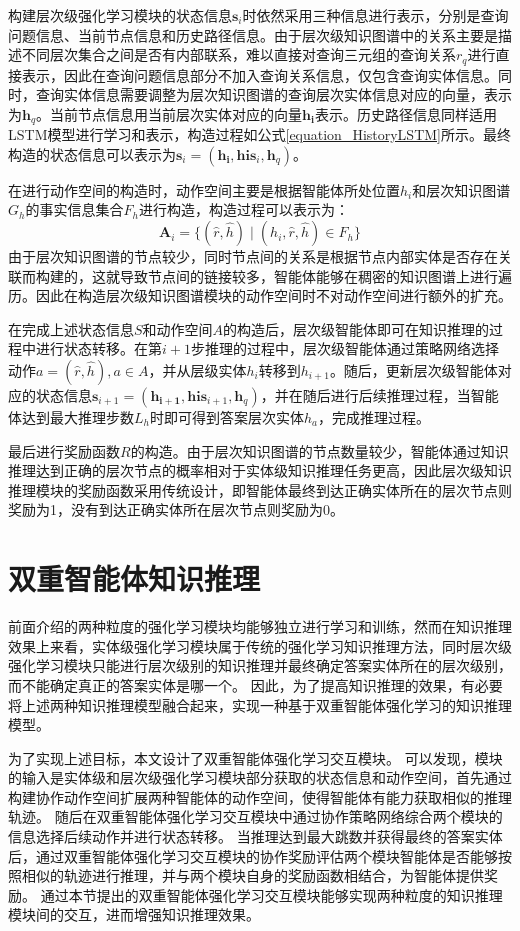\documentclass[algorithmlist, AutoFakeBold, AutoFakeSlant, figurelist, tablelist, nomlist, engineering]{seuthesix}
\begin{document}
构建层次级强化学习模块的状态信息$\bm{s}_i$时依然采用三种信息进行表示，分别是查询问题信息、当前节点信息和历史路径信息。由于层次级知识图谱中的关系主要是描述不同层次集合之间是否有内部联系，难以直接对查询三元组的查询关系$r_q$进行直接表示，因此在查询问题信息部分不加入查询关系信息，仅包含查询实体信息。同时，查询实体信息需要调整为层次知识图谱的查询层次实体信息对应的向量，表示为$\bm{h}_q$。当前节点信息用当前层次实体对应的向量$\bm{h_i}$表示。历史路径信息同样适用LSTM模型进行学习和表示，构造过程如公式\ref{equation_HistoryLSTM}所示。最终构造的状态信息可以表示为$\bm{s}_i = (\bm{h_i}, \bm{his}_i, \bm{h}_q)$。

在进行动作空间的构造时，动作空间主要是根据智能体所处位置$h_i$和层次知识图谱$G_h$的事实信息集合$F_h$进行构造，构造过程可以表示为：
\begin{equation}
  \bm{A}_i = \{(\hat{r}, \hat{h}) \mid (h_i, \hat{r}, \hat{h}) \in F_h\}
  \label{base_2}
\end{equation}
由于层次知识图谱的节点较少，同时节点间的关系是根据节点内部实体是否存在关联而构建的，这就导致节点间的链接较多，智能体能够在稠密的知识图谱上进行遍历。因此在构造层次级知识图谱模块的动作空间时不对动作空间进行额外的扩充。

在完成上述状态信息$S$和动作空间$A$的构造后，层次级智能体即可在知识推理的过程中进行状态转移。在第$i+1$步推理的过程中，层次级智能体通过策略网络选择动作$a = (\hat{r}, \hat{h}), a \in A$，并从层级实体$h_i$转移到$h_{i+1}$。随后，更新层次级智能体对应的状态信息$\bm{s}_{i+1} = (\bm{h_{i+1}}, \bm{his}_{i+1}, \bm{h}_q)$，并在随后进行后续推理过程，当智能体达到最大推理步数$L_h$时即可得到答案层次实体$h_a$，完成推理过程。

最后进行奖励函数$R$的构造。由于层次知识图谱的节点数量较少，智能体通过知识推理达到正确的层次节点的概率相对于实体级知识推理任务更高，因此层次级知识推理模块的奖励函数采用传统设计，即智能体最终到达正确实体所在的层次节点则奖励为1，没有到达正确实体所在层次节点则奖励为0。

\section{双重智能体知识推理}
前面介绍的两种粒度的强化学习模块均能够独立进行学习和训练，然而在知识推理效果上来看，实体级强化学习模块属于传统的强化学习知识推理方法，同时层次级强化学习模块只能进行层次级别的知识推理并最终确定答案实体所在的层次级别，而不能确定真正的答案实体是哪一个。
因此，为了提高知识推理的效果，有必要将上述两种知识推理模型融合起来，实现一种基于双重智能体强化学习的知识推理模型。

为了实现上述目标，本文设计了双重智能体强化学习交互模块。
可以发现，模块的输入是实体级和层次级强化学习模块部分获取的状态信息和动作空间，首先通过构建协作动作空间扩展两种智能体的动作空间，使得智能体有能力获取相似的推理轨迹。
随后在双重智能体强化学习交互模块中通过协作策略网络综合两个模块的信息选择后续动作并进行状态转移。
当推理达到最大跳数并获得最终的答案实体后，通过双重智能体强化学习交互模块的协作奖励评估两个模块智能体是否能够按照相似的轨迹进行推理，并与两个模块自身的奖励函数相结合，为智能体提供奖励。
通过本节提出的双重智能体强化学习交互模块能够实现两种粒度的知识推理模块间的交互，进而增强知识推理效果。
\end{document}
